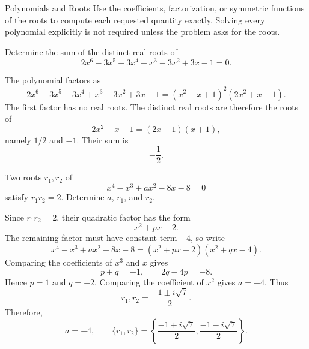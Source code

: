    \begin{expectedproblemgroup}{Polynomials and Roots}
        Use the coefficients, factorization, or symmetric functions of the roots
        to compute each requested quantity exactly. Solving every polynomial
        explicitly is not required unless the problem asks for the roots.

        \begin{expectedsubproblem}[2006 HMMT]
            Determine the sum of the distinct real roots of
            \[
                2x^6-3x^5+3x^4+x^3-3x^2+3x-1=0.
            \]
        \end{expectedsubproblem}

        \begin{expectedsubsolution}
            The polynomial factors as
            \[
                2x^6-3x^5+3x^4+x^3-3x^2+3x-1
                =
                (x^2-x+1)^2(2x^2+x-1).
            \]
            The first factor has no real roots. The distinct real roots are therefore
            the roots of
            \[
                2x^2+x-1=(2x-1)(x+1),
            \]
            namely $1/2$ and $-1$. Their sum is
            \[
                \boxed{-\frac12}.
            \]
        \end{expectedsubsolution}

        \begin{expectedsubproblem}[1997 VTRMC]
            Two roots $r_1,r_2$ of
            \[
                x^4-x^3+ax^2-8x-8=0
            \]
            satisfy $r_1r_2=2$. Determine $a$, $r_1$, and $r_2$.
        \end{expectedsubproblem}

        \begin{expectedsubsolution}
            Since $r_1r_2=2$, their quadratic factor has the form
            \[
                x^2+px+2.
            \]
            The remaining factor must have constant term $-4$, so write
            \[
                x^4-x^3+ax^2-8x-8
                =
                (x^2+px+2)(x^2+qx-4).
            \]
            Comparing the coefficients of $x^3$ and $x$ gives
            \[
                p+q=-1,
                \qquad
                2q-4p=-8.
            \]
            Hence $p=1$ and $q=-2$. Comparing the coefficient of $x^2$ gives
            $a=-4$. Thus
            \[
                r_1,r_2
                =
                \frac{-1\pm i\sqrt7}{2}.
            \]
            Therefore,
            \[
                \boxed{
                    a=-4,
                    \qquad
                    \{r_1,r_2\}
                    =
                    \left\{
                        \frac{-1+i\sqrt7}{2},
                        \frac{-1-i\sqrt7}{2}
                    \right\}
                }.
            \]
        \end{expectedsubsolution}


\end{expectedproblemgroup}
